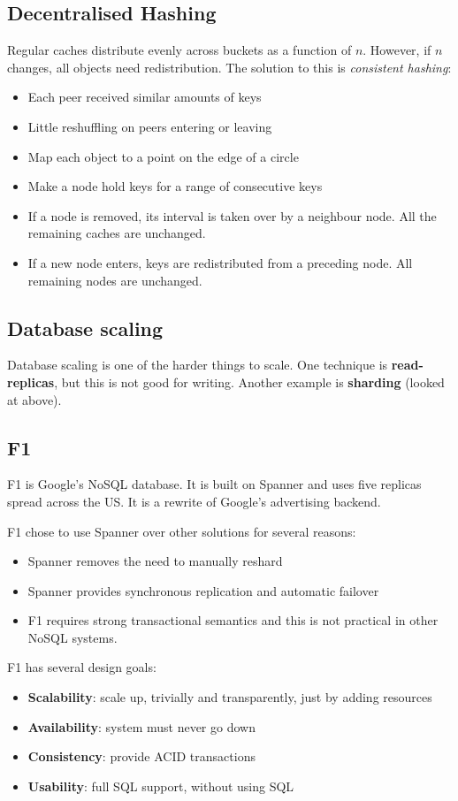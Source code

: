 \documentclass[11pt,a4paper,titlepage,dvipsnames,cmyk]{scrartcl}
\begin{document}
\subsection{Decentralised Hashing}
Regular caches distribute evenly across buckets as a function of $n$. However, if $n$ changes, all objects need redistribution. The solution to this is \textit{consistent hashing}:
\begin{itemize}
    \item Each peer received similar amounts of keys
    \item Little reshuffling on peers entering or leaving
    \item Map each object to a point on the edge of a circle
    \item Make a node hold keys for a range of consecutive keys
    \item If a node is removed, its interval is taken over by a neighbour node. All the remaining caches are unchanged.
    \item If a new node enters, keys are redistributed from a preceding node. All remaining nodes are unchanged.
\end{itemize}

\subsection{Database scaling}
Database scaling is one of the harder things to scale. One technique is \textbf{read-replicas}, but this is not good for writing. Another example is \textbf{sharding} (looked at above). 

\subsection{F1}
F1 is Google's NoSQL database. It is built on Spanner and uses five replicas spread across the US. It is a rewrite of Google's advertising backend.

F1 chose to use Spanner over other solutions for several reasons:
\begin{itemize}
    \item Spanner removes the need to manually reshard
    \item Spanner provides synchronous replication and automatic failover
    \item F1 requires strong transactional semantics and this is not practical in other NoSQL systems.
\end{itemize}

F1 has several design goals:
\begin{itemize}
    \item \textbf{Scalability}: scale up, trivially and transparently, just by adding resources
    \item \textbf{Availability}: system must never go down
    \item \textbf{Consistency}: provide ACID transactions
    \item \textbf{Usability}: full SQL support, without using SQL
\end{itemize}
\end{document}
